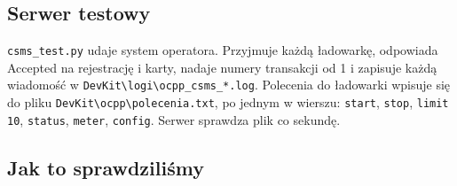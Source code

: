 \documentclass[11pt,a4paper]{article}
\begin{document}
\subsection{Serwer testowy}

\texttt{csms\_test.py} udaje system operatora. Przyjmuje każdą ładowarkę, odpowiada Accepted na rejestrację i karty, nadaje numery transakcji od 1 i zapisuje każdą wiadomość w \texttt{DevKit\textbackslash{}logi\textbackslash{}ocpp\_\allowbreak{}csms\_\allowbreak{}*.\allowbreak{}log}. Polecenia do ładowarki wpisuje się do pliku \texttt{DevKit\textbackslash{}ocpp\textbackslash{}polecenia.\allowbreak{}txt}, po jednym w wierszu: \texttt{start}, \texttt{stop}, \texttt{limit 10}, \texttt{status}, \texttt{meter}, \texttt{config}. Serwer sprawdza plik co sekundę.


\subsection{Jak to sprawdziliśmy}
\end{document}
